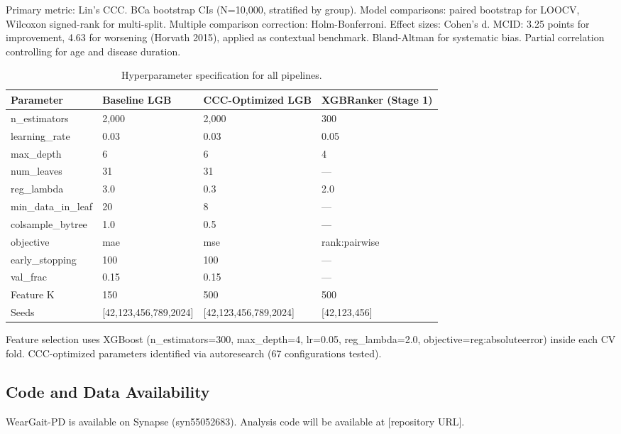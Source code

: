 \documentclass[11pt]{article}
\begin{document}
Primary metric: Lin's CCC\cite{lin1989}. BCa bootstrap CIs (N=10,000, stratified by group). Model comparisons: paired bootstrap for LOOCV, Wilcoxon signed-rank for multi-split. Multiple comparison correction: Holm-Bonferroni. Effect sizes: Cohen's d. MCID: 3.25 points for improvement, 4.63 for worsening (Horvath 2015)\cite{horvath2015}, applied as contextual benchmark. Bland-Altman for systematic bias. Partial correlation controlling for age and disease duration.
\begin{table}[H]
\centering
\caption{Hyperparameter specification for all pipelines.}
\label{tab:hyperparams}
\begin{tabular}{llll}
\toprule
Parameter & Baseline LGB & CCC-Optimized LGB & XGBRanker (Stage 1) \\
\midrule
n\_estimators & 2,000 & 2,000 & 300 \\
learning\_rate & 0.03 & 0.03 & 0.05 \\
max\_depth & 6 & 6 & 4 \\
num\_leaves & 31 & 31 & --- \\
reg\_lambda & 3.0 & 0.3 & 2.0 \\
min\_data\_in\_leaf & 20 & 8 & --- \\
colsample\_bytree & 1.0 & 0.5 & --- \\
objective & mae & mse & rank:pairwise \\
early\_stopping & 100 & 100 & --- \\
val\_frac & 0.15 & 0.15 & --- \\
Feature K & 150 & 500 & 500 \\
Seeds & [42,123,456,789,2024] & [42,123,456,789,2024] & [42,123,456] \\
\bottomrule
\end{tabular}

\smallskip
\footnotesize{Feature selection uses XGBoost (n\_estimators=300, max\_depth=4, lr=0.05, reg\_lambda=2.0, objective=reg:absoluteerror) inside each CV fold. CCC-optimized parameters identified via autoresearch (67 configurations tested).}
\end{table}

\subsection{Code and Data Availability}

WearGait-PD is available on Synapse (syn55052683)\cite{weargait}. Analysis code will be available at [repository URL].
\end{document}
